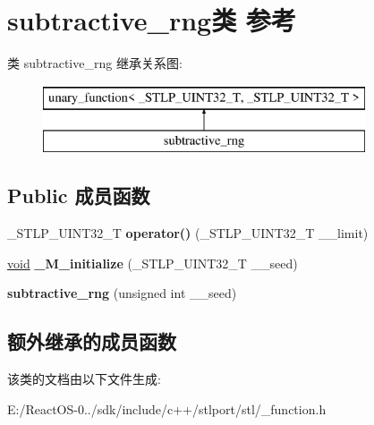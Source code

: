 \hypertarget{classsubtractive__rng}{}\section{subtractive\+\_\+rng类 参考}
\label{classsubtractive__rng}
类 subtractive\+\_\+rng 继承关系图\+:\begin{figure}[H]
\begin{center}
\leavevmode
\includegraphics[height=2.000000cm]{classsubtractive__rng}
\end{center}
\end{figure}
\subsection*{Public 成员函数}
\begin{DoxyCompactItemize}
\item 
\mbox{\label{classsubtractive__rng_a42201be8f864f190d6f27af8bb416cde}} 
\+\_\+\+S\+T\+L\+P\+\_\+\+U\+I\+N\+T32\+\_\+T {\bfseries operator()} (\+\_\+\+S\+T\+L\+P\+\_\+\+U\+I\+N\+T32\+\_\+T \+\_\+\+\_\+limit)
\item 
\mbox{\label{classsubtractive__rng_a8468e1daa23037d4a747e8c7669213f4}} 
\hyperlink{interfacevoid}{void} {\bfseries \+\_\+\+M\+\_\+initialize} (\+\_\+\+S\+T\+L\+P\+\_\+\+U\+I\+N\+T32\+\_\+T \+\_\+\+\_\+seed)
\item 
\mbox{\label{classsubtractive__rng_a6172d1794e8d438a33b5e6a30f97d1e4}} 
{\bfseries subtractive\+\_\+rng} (unsigned int \+\_\+\+\_\+seed)
\end{DoxyCompactItemize}
\subsection*{额外继承的成员函数}


该类的文档由以下文件生成\+:\begin{DoxyCompactItemize}
\item 
E\+:/\+React\+O\+S-\/0../sdk/include/c++/stlport/stl/\+\_\+function.\+h\end{DoxyCompactItemize}
